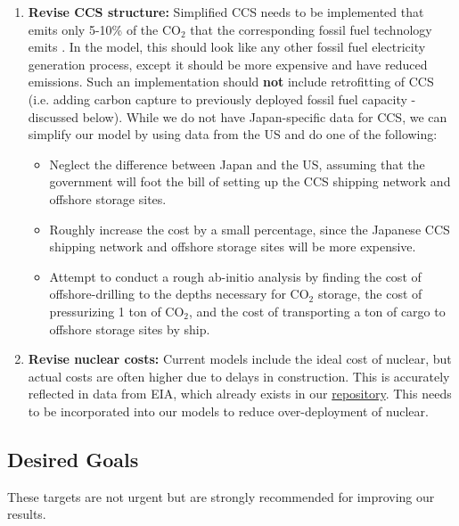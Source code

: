 \documentclass[14pt,a4paper]{article} %
\begin{document}
\begin{enumerate}
\item \textbf{Revise CCS structure:} Simplified CCS needs to be implemented that emits only 5-10\% of the CO$_2$ that the corresponding fossil fuel technology emits \cite{kato_energy_2016}. In the model, this should look like any other fossil fuel electricity generation process, except it should be more expensive and have reduced emissions. Such an implementation should \textbf{not} include retrofitting of CCS (i.e. adding carbon capture to previously deployed fossil fuel capacity - discussed below). While we do not have Japan-specific data for CCS, we can simplify our model by using data from the US and do one of the following:
\begin{itemize}

\item Neglect the difference between Japan and the US, assuming that the government will foot the bill of setting up the CCS shipping network and offshore storage sites.

\item Roughly increase the cost by a small percentage, since the Japanese CCS shipping network and offshore storage sites will be more expensive.

\item Attempt to conduct a rough ab-initio analysis by finding the cost of offshore-drilling to the depths necessary for CO$_2$ storage, the cost of pressurizing 1 ton of CO$_2$, and the cost of transporting a ton of cargo to offshore storage sites by ship.

\end{itemize}

\item \textbf{Revise nuclear costs:} Current models include the ideal cost of nuclear, but actual costs are often higher due to delays in construction. This is accurately reflected in data from EIA, which already exists in our \href{https://github.com/arfc/i2cner/tree/master/data/japan_costs/fossil-ccs-nuc.xlsx}{repository}. This needs to be incorporated into our models to reduce over-deployment of nuclear.

\end{enumerate}

\subsection{Desired Goals}
These targets are not urgent but are strongly recommended for improving our results.
\end{document}
